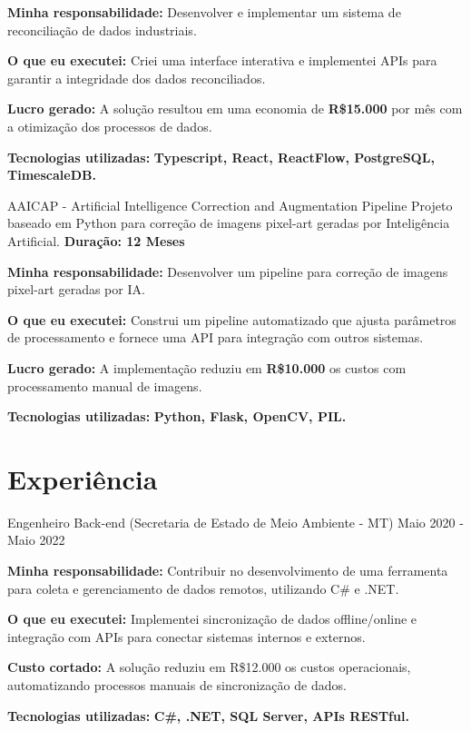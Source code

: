 \resumeItemListStart
\item \textbf{Minha responsabilidade:} Desenvolver e implementar um sistema de reconciliação de dados industriais.
\item \textbf{O que eu executei:} Criei uma interface interativa e implementei APIs para garantir a integridade dos dados reconciliados.
\item \textbf{Lucro gerado:} A solução resultou em uma economia de \textbf{R\$15.000} por mês com a otimização dos processos de dados.
\item \textbf{Tecnologias utilizadas:} \textbf{Typescript, React, ReactFlow, PostgreSQL, TimescaleDB.}
\resumeItemListEnd

\vspace{-2mm}

\resumeProject
{ AAICAP - \textmd{Artificial Intelligence Correction and Augmentation Pipeline}}
{Projeto baseado em Python para correção de imagens pixel-art geradas por Inteligência Artificial.}
{\textbf{Duração: 12 Meses}}

\resumeItemListStart
\item \textbf{Minha responsabilidade:} Desenvolver um pipeline para correção de imagens pixel-art geradas por IA.
\item \textbf{O que eu executei:} Construi um pipeline automatizado que ajusta parâmetros de processamento e fornece uma API para integração com outros sistemas.
\item \textbf{Lucro gerado:} A implementação reduziu em \textbf{R\$10.000} os custos com processamento manual de imagens.
\item \textbf{Tecnologias utilizadas:} \textbf{Python, Flask, OpenCV, PIL.}
\resumeItemListEnd

\resumeSubHeadingListEnd
\vspace{-8.5mm}

\section{\textbf{Experiência}}
\resumeSubHeadingListStart
\resumeSubheading
{ Engenheiro Back-end \textmd{(Secretaria de Estado de Meio Ambiente - MT)}}{}
{}{Maio 2020 - Maio 2022}
\vspace{-2.0mm}
\resumeItemListStart
\item \textbf{Minha responsabilidade:} Contribuir no desenvolvimento de uma ferramenta para coleta e gerenciamento de dados remotos, utilizando C\# e .NET.
\item \textbf{O que eu executei:} Implementei sincronização de dados offline/online e integração com APIs para conectar sistemas internos e externos.
\item \textbf{Custo cortado:} A solução reduziu em R\$12.000 os custos operacionais, automatizando processos manuais de sincronização de dados.
\item \textbf{Tecnologias utilizadas:} \textbf{C\#, .NET, SQL Server, APIs RESTful.}
\resumeItemListEnd

